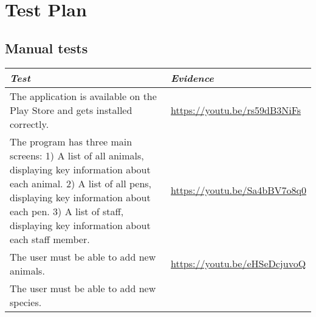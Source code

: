 \documentclass[english,a4paper,]{report}
\begin{document}
\hypertarget{test-plan}{%
\chapter{Test Plan}\label{test-plan}}

\hypertarget{manual-tests}{%
\section{Manual tests}\label{manual-tests}}

\begin{longtable}[]{@{}ll@{}}
\toprule
\begin{minipage}[b]{0.47\columnwidth}\raggedright
\emph{Test}\strut
\end{minipage} & \begin{minipage}[b]{0.47\columnwidth}\raggedright
\emph{Evidence}\strut
\end{minipage}\tabularnewline
\midrule
\endhead
\begin{minipage}[t]{0.47\columnwidth}\raggedright
The application is available on the Play Store and gets installed
correctly.\strut
\end{minipage} & \begin{minipage}[t]{0.47\columnwidth}\raggedright
\url{https://youtu.be/rs59dB3NiFs}\strut
\end{minipage}\tabularnewline
\begin{minipage}[t]{0.47\columnwidth}\raggedright
The program has three main screens: 1) A list of all animals, displaying
key information about each animal. 2) A list of all pens, displaying key
information about each pen. 3) A list of staff, displaying key
information about each staff member.\strut
\end{minipage} & \begin{minipage}[t]{0.47\columnwidth}\raggedright
\url{https://youtu.be/Sa4bBV7o8q0}\strut
\end{minipage}\tabularnewline
\begin{minipage}[t]{0.47\columnwidth}\raggedright
The user must be able to add new animals.\strut
\end{minipage} & \begin{minipage}[t]{0.47\columnwidth}\raggedright
\url{https://youtu.be/eHSeDcjuvoQ}\strut
\end{minipage}\tabularnewline
\begin{minipage}[t]{0.47\columnwidth}\raggedright
The user must be able to add new species.\strut
\end{minipage} & \begin{minipage}[t]{0.47\columnwidth}\raggedright

\end{minipage}
\end{longtable}
\end{document}
